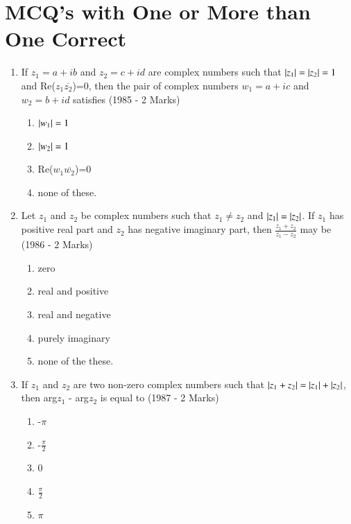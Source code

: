 \documentclass[journal,12pt,twocolumn]{IEEEtran}
\theoremstyle{remark}
\begin{document}
\section{ MCQ's with One or More than One Correct}
\begin{enumerate}
	\item If $z_{1}=a+ib$ and $z_{2}=c+id$ are complex numbers such that $\left\vert z_{1}\right\vert=\left\vert z_{2}\right\vert=1$ and Re($z_{1}\overline{z_{2}}$)=0, then the pair of complex numbers $w_{1}=a+ic$ and $w_{2}=b+id$ satisfies \hfill{(1985 - 2 Marks)}
		\begin{multicols}{2}
\begin{enumerate}[label=(\alph*)]
	\item $\left\vert w_{1}\right\vert=1$
	\item $\left\vert w_{2}\right\vert=1$
	\item Re($w_{1}\overline{w_{2}}$)=0
	\item none of these.
\end{enumerate}
		\end{multicols}

\item Let $z_{1}$ and $z_{2}$ be complex numbers such that $z_{1}\neq z_{2}$ and $\left\vert z_{1}\right\vert=\left\vert z_{2}\right\vert$. If $z_{1}$ has positive real part and $z_{2}$ has negative imaginary part, then $\frac{z_{1}+z_{2}}{z_{1}-z_{2}}$ may be \hfill{(1986 - 2 Marks)}
	\begin{multicols}{2}
\begin{enumerate}[label=(\alph*)]
	\item zero
	\item real and positive
	\item real and negative
	\item purely imaginary
	\item none of the these.
\end{enumerate}
	\end{multicols}

\item If $z_{1}$ and $z_{2}$ are two non-zero complex numbers such that $\left\vert z_{1}+z_{2}\right\vert=\left\vert z_{1}\right\vert+\left\vert z_{2}\right\vert$, then arg$z_{1}$ - arg$z_{2}$ is equal to \hfill{(1987 - 2 Marks)}
	\begin{multicols}{4}
\begin{enumerate}[label=(\alph*)]
	\item -$\pi$
	\item -$\frac{\pi}{2}$
        \item 0
        \item $\frac{\pi}{2}$
	\item $\pi$
\end{enumerate}
	\end{multicols}


\end{enumerate}
\end{document}
